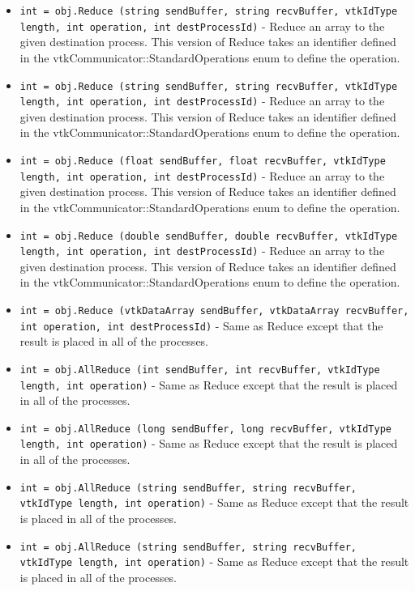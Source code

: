 \begin{itemize}
\item  \verb|int = obj.Reduce (string sendBuffer, string recvBuffer, vtkIdType length, int operation, int destProcessId)| -  Reduce an array to the given destination process.  This version of Reduce
 takes an identifier defined in the
 vtkCommunicator::StandardOperations enum to define the operation.

\item  \verb|int = obj.Reduce (string sendBuffer, string recvBuffer, vtkIdType length, int operation, int destProcessId)| -  Reduce an array to the given destination process.  This version of Reduce
 takes an identifier defined in the
 vtkCommunicator::StandardOperations enum to define the operation.

\item  \verb|int = obj.Reduce (float sendBuffer, float recvBuffer, vtkIdType length, int operation, int destProcessId)| -  Reduce an array to the given destination process.  This version of Reduce
 takes an identifier defined in the
 vtkCommunicator::StandardOperations enum to define the operation.

\item  \verb|int = obj.Reduce (double sendBuffer, double recvBuffer, vtkIdType length, int operation, int destProcessId)| -  Reduce an array to the given destination process.  This version of Reduce
 takes an identifier defined in the
 vtkCommunicator::StandardOperations enum to define the operation.

\item  \verb|int = obj.Reduce (vtkDataArray sendBuffer, vtkDataArray recvBuffer, int operation, int destProcessId)| -  Same as Reduce except that the result is placed in all of the processes.

\item  \verb|int = obj.AllReduce (int sendBuffer, int recvBuffer, vtkIdType length, int operation)| -  Same as Reduce except that the result is placed in all of the processes.

\item  \verb|int = obj.AllReduce (long sendBuffer, long recvBuffer, vtkIdType length, int operation)| -  Same as Reduce except that the result is placed in all of the processes.

\item  \verb|int = obj.AllReduce (string sendBuffer, string recvBuffer, vtkIdType length, int operation)| -  Same as Reduce except that the result is placed in all of the processes.

\item  \verb|int = obj.AllReduce (string sendBuffer, string recvBuffer, vtkIdType length, int operation)| -  Same as Reduce except that the result is placed in all of the processes.


\end{itemize}
